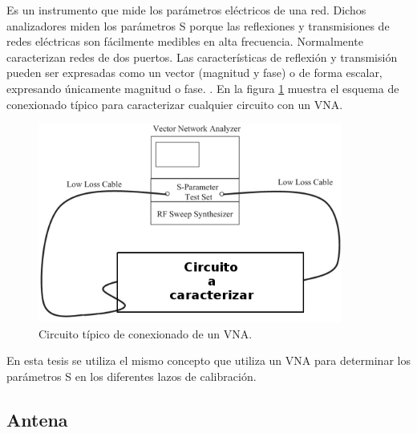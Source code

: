 Es un instrumento que mide los parámetros eléctricos de una red. Dichos analizadores miden los parámetros S porque las
reflexiones y transmisiones de redes eléctricas son fácilmente medibles en alta frecuencia. Normalmente caracterizan redes de
dos puertos. Las características de reflexión y transmisión pueden ser expresadas como un vector (magnitud y fase) o de forma
escalar, expresando únicamente magnitud o fase. \cite{AgilentTechnologies2012}. En la figura \ref{fig:tipicalVNA} muestra el
esquema de conexionado típico para caracterizar cualquier circuito con un VNA.

\begin{figure}[H]
 \centering
 \includegraphics[width=10cm]{gfx/tipicalVNA.png}
 \caption{Circuito típico de conexionado de un VNA.}
 \label{fig:tipicalVNA}
\end{figure}

En esta tesis se utiliza el mismo concepto que utiliza un VNA para determinar los parámetros S en los diferentes lazos de 
calibración.


\subsection{Antena} 

